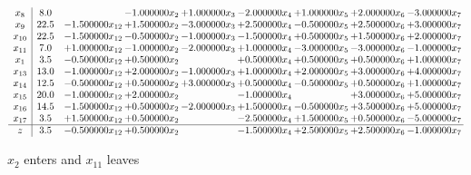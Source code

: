 \documentclass[10pt]{article}
\begin{document}
 \[\begin{array}{c| c c@{\hskip 2pt} c@{\hskip 2pt} c@{\hskip 2pt} c@{\hskip 2pt} c@{\hskip 2pt} c@{\hskip 2pt} c@{\hskip 2pt} }
 x_{8}   &  8.0  &   & -1.000000 x_{2} & + 1.000000 x_{3} & -2.000000 x_{4} & + 1.000000 x_{5} & + 2.000000 x_{6} & -3.000000 x_{7}\\
 x_{9}   &  22.5 & -1.500000 x_{12} & + 1.500000 x_{2} & -3.000000 x_{3} & + 2.500000 x_{4} & -0.500000 x_{5} & + 2.500000 x_{6} & + 3.000000 x_{7}\\
 x_{10}   &  22.5 & -1.500000 x_{12} & -0.500000 x_{2} & -1.000000 x_{3} & -1.500000 x_{4} & + 0.500000 x_{5} & + 1.500000 x_{6} & + 2.000000 x_{7}\\
 x_{11}   &  7.0 & + 1.000000 x_{12} & -1.000000 x_{2} & -2.000000 x_{3} & + 1.000000 x_{4} & -3.000000 x_{5} & -3.000000 x_{6} & -1.000000 x_{7}\\
 x_{1}   &  3.5 & -0.500000 x_{12} & + 0.500000 x_{2} &   & + 0.500000 x_{4} & + 0.500000 x_{5} & + 0.500000 x_{6} & + 1.000000 x_{7}\\
 x_{13}   &  13.0 & -1.000000 x_{12} & + 2.000000 x_{2} & -1.000000 x_{3} & + 1.000000 x_{4} & + 2.000000 x_{5} & + 3.000000 x_{6} & + 4.000000 x_{7}\\
 x_{14}   &  12.5 & -0.500000 x_{12} & + 0.500000 x_{2} & + 3.000000 x_{3} & + 0.500000 x_{4} & -0.500000 x_{5} & + 0.500000 x_{6} & + 1.000000 x_{7}\\
 x_{15}   &  20.0 & -1.000000 x_{12} & + 2.000000 x_{2} &   & -1.000000 x_{4} &   & + 3.000000 x_{6} & + 5.000000 x_{7}\\
 x_{16}   &  14.5 & -1.500000 x_{12} & + 0.500000 x_{2} & -2.000000 x_{3} & + 1.500000 x_{4} & -0.500000 x_{5} & + 3.500000 x_{6} & + 5.000000 x_{7}\\
 x_{17}   &  3.5 & + 1.500000 x_{12} & + 0.500000 x_{2} &   & -2.500000 x_{4} & + 1.500000 x_{5} & + 0.500000 x_{6} & -5.000000 x_{7}\\
\hline
z    &  3.5 & -0.500000 x_{12} & + 0.500000 x_{2} &   & -1.500000 x_{4} & + 2.500000 x_{5} & + 2.500000 x_{6} & -1.000000 x_{7}\\
\end{array}\]


 $ x_{2} $ enters and $ x_{11} $ leaves 
\end{document}
